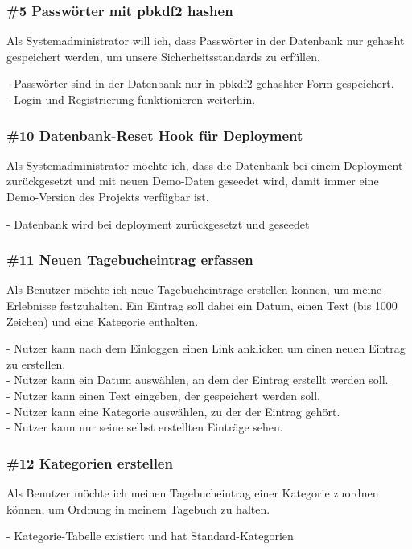 \subsubsection*{\#5 Passwörter mit pbkdf2 hashen}
Als Systemadministrator will ich, dass Passwörter in der Datenbank nur gehasht gespeichert werden, um unsere Sicherheitsstandards zu erfüllen.

\noindent
- Passwörter sind in der Datenbank nur in pbkdf2 gehashter Form gespeichert.\\
- Login und Registrierung funktionieren weiterhin.


\subsubsection*{\#10 Datenbank-Reset Hook für Deployment}
Als Systemadministrator möchte ich, dass die Datenbank bei einem Deployment zurückgesetzt und mit neuen Demo-Daten geseedet wird, damit immer eine Demo-Version des Projekts verfügbar ist.

\noindent
- Datenbank wird bei deployment zurückgesetzt und geseedet


\subsubsection*{\#11 Neuen Tagebucheintrag erfassen}
Als Benutzer möchte ich neue Tagebucheinträge erstellen können, um meine Erlebnisse festzuhalten. Ein Eintrag soll dabei ein Datum, einen Text (bis 1000 Zeichen) und eine Kategorie enthalten.

\noindent
- Nutzer kann nach dem Einloggen einen Link anklicken um einen neuen Eintrag zu erstellen.\\
- Nutzer kann ein Datum auswählen, an dem der Eintrag erstellt werden soll.\\
- Nutzer kann einen Text eingeben, der gespeichert werden soll.\\
- Nutzer kann eine Kategorie auswählen, zu der der Eintrag gehört.\\
- Nutzer kann nur seine selbst erstellten Einträge sehen.


\subsubsection*{\#12 Kategorien erstellen}
Als Benutzer möchte ich meinen Tagebucheintrag einer Kategorie zuordnen können, um Ordnung in meinem Tagebuch zu halten.

\noindent
- Kategorie-Tabelle existiert und hat Standard-Kategorien


